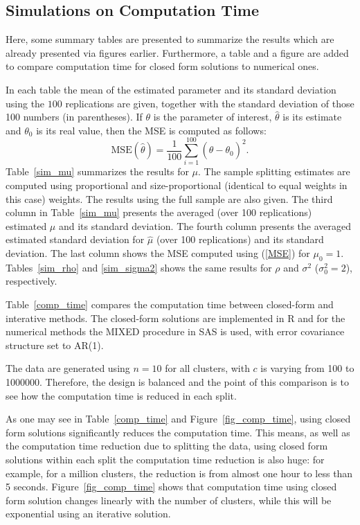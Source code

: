 \documentclass[11pt,a5paper,twoside]{book}
\begin{document}
{\subsection{Simulations on Computation  Time}
Here, some summary tables are presented to summarize the results which are already presented via figures earlier. Furthermore, a table and a figure are added to compare computation time for closed form solutions to numerical ones.

In each table the mean of the estimated parameter and its standard deviation using the $100$ replications are given, together with the standard deviation of those 100 numbers (in parentheses). If $\theta$ is the parameter of interest, $\widehat{\theta}$ is its estimate and $\theta_0$ is its real value, then the MSE is computed as follows:
\begin{equation}
\label{MSE}
\mathrm{MSE}(\widehat{\theta})=\frac{1}{100}\sum_{i=1}^{100} (\widehat{\theta}-\theta_0)^2.
\end{equation}
Table~\ref{sim_mu} summarizes the results for $\mu$. The sample splitting estimates are computed using proportional and size-proportional (identical to equal weights in this case) weights. The results using the full sample are also given. The third column in Table~\ref{sim_mu} presents the averaged (over 100 replications) estimated $\mu$ and its standard deviation. The fourth column presents the averaged estimated standard deviation for $\widehat{\mu}$ (over 100 replications) and its standard deviation. The last column shows the MSE computed using (\ref{MSE}) for $\mu_0=1$. Tables~\ref{sim_rho} and \ref{sim_sigma2} shows the same results for $\rho$ and $\sigma^2$ ($\sigma^2_0=2$), respectively.

Table~\ref{comp_time} compares the computation time 
between closed-form and interative methods.  The closed-form solutions are implemented in R and for the numerical methods the MIXED procedure in SAS is used, with error covariance structure set to AR(1).

The data are generated using $n=10$ for all clusters, with $c$ is varying from 100 to 1000000. Therefore, the design is balanced and the point of this comparison is to see how the computation time is reduced in each split.

As one may see in Table~\ref{comp_time} and Figure~\ref{fig_comp_time}, using closed form solutions  significantly reduces the computation time. This means, as well as the computation time reduction due to splitting the data, using closed form solutions within each split the computation time reduction is also huge: for example, for a million clusters, the reduction is from  almost one hour to less than 5 seconds. Figure~\ref{fig_comp_time} shows that computation time using closed form solution changes linearly with the number of clusters, while this will be exponential using an iterative solution.

}
\end{document}
